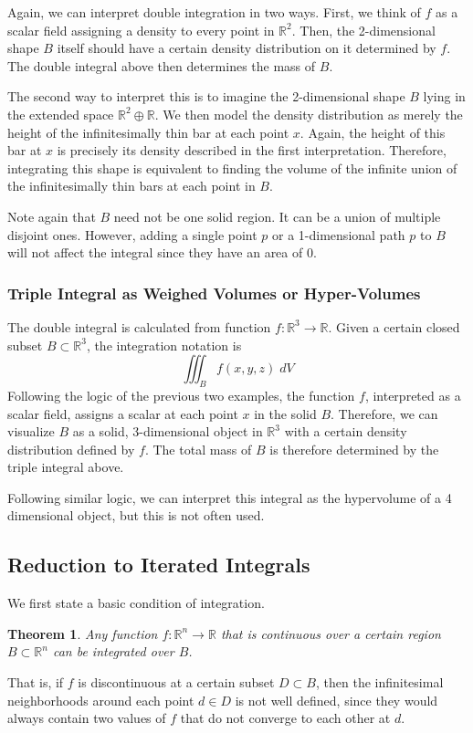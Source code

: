 \documentclass{article}
\newtheorem{theorem}{Theorem}[section]
\theoremstyle{remark}
\theoremstyle{definition}
\begin{document}
Again, we can interpret double integration in two ways. First, we think of $f$ as a scalar field assigning a density to every point in $\mathbb{R}^2$. Then, the 2-dimensional shape $B$ itself should have a certain density distribution on it determined by $f$. The double integral above then determines the mass of $B$. 

The second way to interpret this is to imagine the 2-dimensional shape $B$ lying in the extended space $\mathbb{R}^2 \oplus \mathbb{R}$. We then model the density distribution as merely the height of the infinitesimally thin bar at each point $x$. Again, the height of this bar at $x$ is precisely its density described in the first interpretation. Therefore, integrating this shape is equivalent to finding the volume of the infinite union of the infinitesimally thin bars at each point in $B$. 

Note again that $B$ need not be one solid region. It can be a union of multiple disjoint ones. However, adding a single point $p$ or a 1-dimensional path $p$ to $B$ will not affect the integral since they have an area of $0$.

\subsubsection{Triple Integral as Weighed Volumes or Hyper-Volumes}
The double integral is calculated from function $f: \mathbb{R}^3 \longrightarrow \mathbb{R}$. Given a certain closed subset $B \subset \mathbb{R}^3$, the integration notation is
\[\iiint_B f(x, y, z) \; d V\]
Following the logic of the previous two examples, the function $f$, interpreted as a scalar field, assigns a scalar at each point $x$ in the solid $B$. Therefore, we can visualize $B$ as a solid, 3-dimensional object in $\mathbb{R}^3$ with a certain density distribution defined by $f$. The total mass of $B$ is therefore determined by the triple integral above.

Following similar logic, we can interpret this integral as the hypervolume of a 4 dimensional object, but this is not often used. 

\subsection{Reduction to Iterated Integrals}
We first state a basic condition of integration. 

\begin{theorem}
Any function $f: \mathbb{R}^n \longrightarrow \mathbb{R}$ that is continuous over a certain region $B \subset \mathbb{R}^n$ can be integrated over $B$. 
\end{theorem}
That is, if $f$ is discontinuous at a certain subset $D \subset B$, then the infinitesimal neighborhoods around each point $d \in D$ is not well defined, since they would always contain two values of $f$ that do not converge to each other at $d$. 
\end{document}
